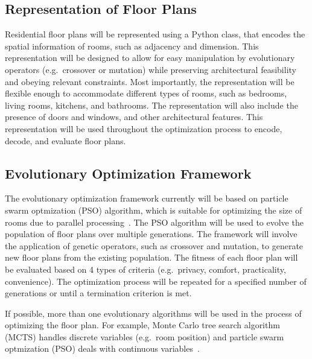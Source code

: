 \documentclass[]{article}
\begin{document}
\subsection{Representation of Floor Plans}
Residential floor plans will be represented using a Python class, that encodes the spatial information of rooms, such as adjacency and dimension. This representation will be designed to allow for easy manipulation by evolutionary operators (e.g.~crossover or mutation) while preserving architectural feasibility and obeying relevant constraints. Most importantly, the representation will be flexible enough to accommodate different types of rooms, such as bedrooms, living rooms, kitchens, and bathrooms. The representation will also include the presence of doors and windows, and other architectural features. This representation will be used throughout the optimization process to encode, decode, and evaluate floor plans.

\subsection{Evolutionary Optimization Framework}
The evolutionary optimization framework currently will be based on particle swarm optmization (PSO) algorithm, which is suitable for optimizing the size of rooms due to parallel processing~\cite{YAN2024110546}. The PSO algorithm will be used to evolve the population of floor plans over multiple generations. The framework will involve the application of genetic operators, such as crossover and mutation, to generate new floor plans from the existing population. The fitness of each floor plan will be evaluated based on 4 types of criteria (e.g.\ privacy, comfort, practicality, convenience). The optimization process will be repeated for a specified number of generations or until a termination criterion is met.

If possible, more than one evolutionary algorithms will be used in the process of optimizing the floor plan. For example, Monte Carlo tree search algorithm (MCTS) handles discrete variables (e.g.\ room position) and particle swarm optmization (PSO) deals with continuous variables~\cite{YAN2024110546}.
\end{document}
